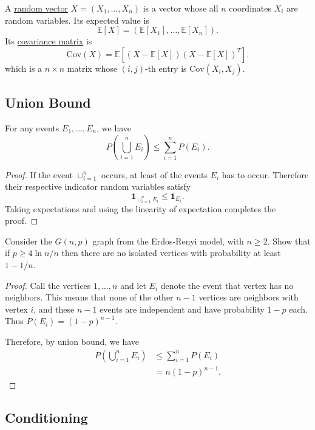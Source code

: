 A \underline{random vector} $X = (X_1, \dots, X_n)$ is a vector whose all $n$ coordinates $X_i$ 
are random variables. Its expected value is
\[ \mathbb{E}[X] = (\mathbb{E}[X_1], \dots, \mathbb{E}[X_n]). \]
Its \underline{covariance matrix} is 
\[ \mathrm{Cov}(X) = \mathbb{E}[(X - \mathbb{E}[X]) (X - \mathbb{E}[X])^T]. \]
which is a $n \times n$ matrix whose $(i, j)$-th entry is $\mathrm{Cov}(X_i, X_j)$.


\subsection{Union Bound}
\begin{lemma}
\label{lem:1.4.1}
For any events $E_1, \dots, E_n$, we have 
\[ P \left( \bigcup_{i = 1}^n E_i \right) \leq \sum_{i = 1}^{n} P(E_i). \]
\end{lemma}

\begin{proof}
If the event $\cup_{i = 1}^n$ occurs, at least of the events $E_i$ has to occur. Therefore their respective 
indicator random variables satisfy 
\[ \mathbf{1}_{\cup_{i = 1}^n E_i} \leq \mathbf{1}_{E_i}. \]
Taking expectations and using the linearity of expectation completes the proof.
\end{proof}

\begin{example}
\label{ex:1.4.2}
Consider the $G(n, p)$ graph from the Erdos-Renyi model, with $n \geq 2$. Show that if $p \geq 4 \ln{n}/n$ 
then there are no isolated vertices with probability at least $1 - 1/n$.
\end{example}

\begin{proof}
Call the vertices $1, \dots, n$ and let $E_i$ denote the event that vertex has no neighbors. This means that 
none of the other $n - 1$ vertices are neighbors with vertex $i$, and these $n - 1$ events are independent 
and have probability $1 - p$ each. Thus $P(E_i) = (1 - p)^{n - 1}$.

Therefore, by union bound, we have 
\begin{align*}
	P \left( \bigcup_{i = 1}^n E_i \right) 
	&\leq \sum_{i = 1}^{n} P(E_i) \\
	&= n(1 - p)^{n - 1}.
\end{align*}
\end{proof}


\subsection{Conditioning}

